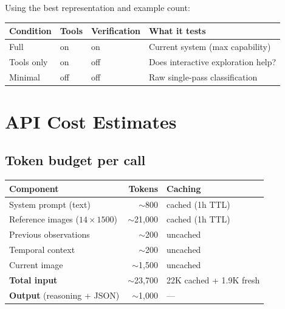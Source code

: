 \documentclass[11pt, a4paper]{article}
\begin{document}
Using the best representation and example count:

\begin{center}
\small
\begin{tabular}{@{}llll@{}}
\toprule
\textbf{Condition} & \textbf{Tools} & \textbf{Verification} & \textbf{What it tests} \\
\midrule
Full       & on  & on  & Current system (max capability) \\
Tools only & on  & off & Does interactive exploration help? \\
Minimal    & off & off & Raw single-pass classification \\
\bottomrule
\end{tabular}
\end{center}

\section{API Cost Estimates}

\subsection{Token budget per call}

\begin{center}
\small
\begin{tabular}{@{}lrl@{}}
\toprule
\textbf{Component} & \textbf{Tokens} & \textbf{Caching} \\
\midrule
System prompt (text)                & $\sim$800     & cached (1h TTL) \\
Reference images ($14 \times 1500$) & $\sim$21{,}000 & cached (1h TTL) \\
Previous observations               & $\sim$200     & uncached \\
Temporal context                     & $\sim$200     & uncached \\
Current image                        & $\sim$1{,}500 & uncached \\
\midrule
\textbf{Total input}                & $\sim$23{,}700 & 22K cached + 1.9K fresh \\
\textbf{Output} (reasoning + JSON)  & $\sim$1{,}000  & --- \\
\bottomrule
\end{tabular}
\end{center}
\end{document}
